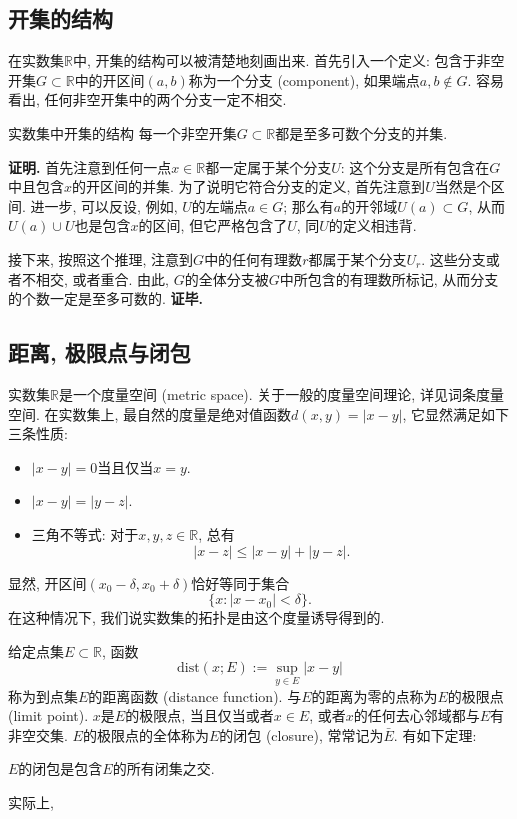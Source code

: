 \subsection{开集的结构}
在实数集$\mathbb{R}$中, 开集的结构可以被清楚地刻画出来. 首先引入一个定义: 包含于非空开集$G\subset\mathbb{R}$中的开区间$(a,b)$称为一个分支 (component), 如果端点$a,b\notin G$. 容易看出, 任何非空开集中的两个分支一定不相交.

\begin{theorem}{实数集中开集的结构}
每一个非空开集$G\subset\mathbb{R}$都是至多可数个分支的并集. 
\end{theorem}
\textbf{证明.} 首先注意到任何一点$x\in\mathbb{R}$都一定属于某个分支$U$: 这个分支是所有包含在$G$中且包含$x$的开区间的并集. 为了说明它符合分支的定义, 首先注意到$U$当然是个区间. 进一步, 可以反设, 例如, $U$的左端点$a\in G$; 那么有$a$的开邻域$U(a)\subset G$, 从而$U(a)\cup U$也是包含$x$的区间, 但它严格包含了$U$, 同$U$的定义相违背.

接下来, 按照这个推理, 注意到$G$中的任何有理数$r$都属于某个分支$U_r$. 这些分支或者不相交, 或者重合. 由此, $G$的全体分支被$G$中所包含的有理数所标记, 从而分支的个数一定是至多可数的. \textbf{证毕.}

\subsection{距离, 极限点与闭包}
实数集$\mathbb{R}$是一个度量空间 (metric space). 关于一般的度量空间理论, 详见词条度量空间. 在实数集上, 最自然的度量是绝对值函数$d(x,y)=|x-y|$, 它显然满足如下三条性质:

\begin{itemize}
\item $|x-y|=0$当且仅当$x=y$.
\item $|x-y|=|y-z|$.
\item 三角不等式: 对于$x,y,z\in\mathbb{R}$, 总有
$$
|x-z|\leq|x-y|+|y-z|.
$$
\end{itemize}

显然, 开区间$(x_0-\delta,x_0+\delta)$恰好等同于集合
$$
\{x:|x-x_0|<\delta\}.
$$
在这种情况下, 我们说实数集的拓扑是由这个度量诱导得到的.

给定点集$E\subset\mathbb{R}$, 函数
$$
\text{dist}(x;E):=\sup_{y\in E}|x-y|
$$
称为到点集$E$的距离函数 (distance function). 与$E$的距离为零的点称为$E$的极限点 (limit point). $x$是$E$的极限点, 当且仅当或者$x\in E$, 或者$x$的任何去心邻域都与$E$有非空交集.
$E$的极限点的全体称为$E$的闭包 (closure), 常常记为$\bar E$. 有如下定理:
\begin{theorem}{}
$E$的闭包是包含$E$的所有闭集之交.
\end{theorem}
实际上, 